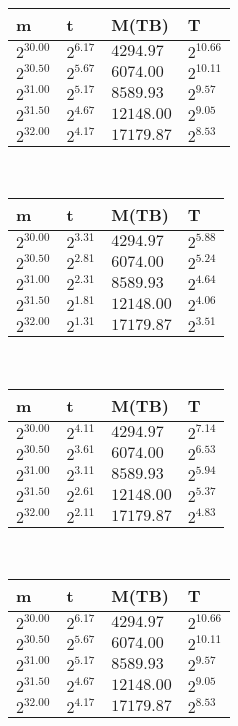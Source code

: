  \ 
\begin{tabular}{llll}
m & t & M(TB) & T \\ \hline
$2^{30.00}$ & $2^{6.17}$ & $4294.97$ & $2^{10.66}$ \\
$2^{30.50}$ & $2^{5.67}$ & $6074.00$ & $2^{10.11}$ \\
$2^{31.00}$ & $2^{5.17}$ & $8589.93$ & $2^{9.57}$ \\
$2^{31.50}$ & $2^{4.67}$ & $12148.00$ & $2^{9.05}$ \\
$2^{32.00}$ & $2^{4.17}$ & $17179.87$ & $2^{8.53}$ \\
\end{tabular}
 \ 
\begin{tabular}{llll}
m & t & M(TB) & T \\ \hline
$2^{30.00}$ & $2^{3.31}$ & $4294.97$ & $2^{5.88}$ \\
$2^{30.50}$ & $2^{2.81}$ & $6074.00$ & $2^{5.24}$ \\
$2^{31.00}$ & $2^{2.31}$ & $8589.93$ & $2^{4.64}$ \\
$2^{31.50}$ & $2^{1.81}$ & $12148.00$ & $2^{4.06}$ \\
$2^{32.00}$ & $2^{1.31}$ & $17179.87$ & $2^{3.51}$ \\
\end{tabular}
 \ 
\begin{tabular}{llll}
m & t & M(TB) & T \\ \hline
$2^{30.00}$ & $2^{4.11}$ & $4294.97$ & $2^{7.14}$ \\
$2^{30.50}$ & $2^{3.61}$ & $6074.00$ & $2^{6.53}$ \\
$2^{31.00}$ & $2^{3.11}$ & $8589.93$ & $2^{5.94}$ \\
$2^{31.50}$ & $2^{2.61}$ & $12148.00$ & $2^{5.37}$ \\
$2^{32.00}$ & $2^{2.11}$ & $17179.87$ & $2^{4.83}$ \\
\end{tabular}
 \ 
\begin{tabular}{llll}
m & t & M(TB) & T \\ \hline
$2^{30.00}$ & $2^{6.17}$ & $4294.97$ & $2^{10.66}$ \\
$2^{30.50}$ & $2^{5.67}$ & $6074.00$ & $2^{10.11}$ \\
$2^{31.00}$ & $2^{5.17}$ & $8589.93$ & $2^{9.57}$ \\
$2^{31.50}$ & $2^{4.67}$ & $12148.00$ & $2^{9.05}$ \\
$2^{32.00}$ & $2^{4.17}$ & $17179.87$ & $2^{8.53}$ \\
\end{tabular}
